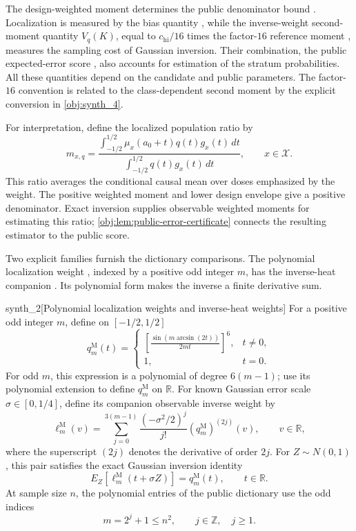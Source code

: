 \documentclass[11pt]{article}
\begin{document}
The design-weighted moment  determines the public denominator bound . Localization is measured by the bias quantity , while the inverse-weight second-moment quantity \(V_q(K)\), equal to \(c_{\mathrm{hi}}/16\) times the factor-\(16\) reference moment , measures the sampling cost of Gaussian inversion. Their combination, the public expected-error score , also accounts for estimation of the stratum probabilities. All these quantities depend on the candidate and public parameters. The factor-\(16\) convention is related to the class-dependent second moment by the explicit conversion in \cref{obj:synth_4}.

For interpretation, define the localized population ratio  by
\[
m_{x,q}
=
\frac{\displaystyle\int_{-1/2}^{1/2}
\mu_x(a_0+t)q(t)g_x(t)\,dt}
{\displaystyle\int_{-1/2}^{1/2}q(t)g_x(t)\,dt},
\qquad x\in\mathcal X.
\]
This ratio averages the conditional causal mean over doses emphasized by the weight. The positive weighted moment and lower design envelope give a positive denominator. Exact inversion supplies observable weighted moments for estimating this ratio; \cref{obj:lem:public-error-certificate} connects the resulting estimator to the public score.

Two explicit families furnish the dictionary comparisons. The polynomial localization weight , indexed by a positive odd integer \(m\), has the inverse-heat companion . Its polynomial form makes the inverse a finite derivative sum.

\begin{definitionv}{synth_2}[Polynomial localization weights and inverse-heat weights]
For a positive odd integer \(m\), define on \([-1/2,1/2]\)
\[
q_m^{\mathrm M}(t)=
\begin{cases}
\displaystyle
\left[\frac{\sin(m\arcsin(2t))}{2mt}\right]^6,
&t\ne0,\\[6pt]
1,&t=0.
\end{cases}
\]
For odd \(m\), this expression is a polynomial of degree \(6(m-1)\); use its polynomial extension to define \(q_m^{\mathrm M}\) on \(\mathbb R\). For known Gaussian error scale \(\sigma\in[0,1/4]\), define its companion observable inverse weight by
\[
\ell_m^{\mathrm M}(v)
=\sum_{j=0}^{3(m-1)}
\frac{(-\sigma^2/2)^j}{j!}
(q_m^{\mathrm M})^{(2j)}(v),
\qquad v\in\mathbb R,
\]
where the superscript \((2j)\) denotes the derivative of order \(2j\). For \(Z\sim N(0,1)\), this pair satisfies the exact Gaussian inversion identity
\[
E_Z\!\left[\ell_m^{\mathrm M}(t+\sigma Z)\right]
=q_m^{\mathrm M}(t),\qquad t\in\mathbb R.
\]
At sample size \(n\), the polynomial entries of the public dictionary use the odd indices
\[
m=2^j+1\le n^2,\qquad j\in\mathbb Z,\quad j\ge1.
\]
\end{definitionv}
\end{document}
